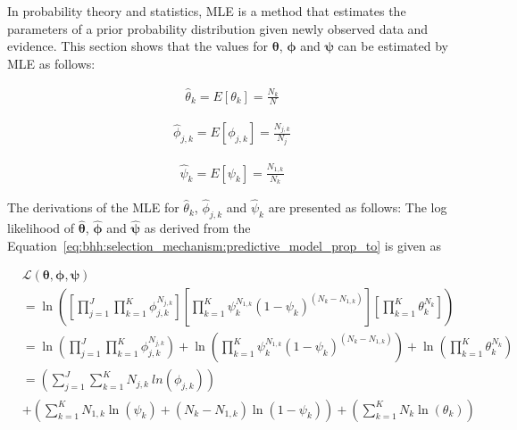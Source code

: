 In probability theory and statistics, \acf{MLE} is a method that estimates the parameters of a prior probability distribution given newly observed data and evidence. This section shows that the values for $\boldsymbol{\theta}$, $\boldsymbol{\phi}$ and $\boldsymbol{\psi}$ can be estimated by \acs{MLE} as follows:

\begin{equation}
      \label{eq:bhh:optimisation_step:mle:theta}
      \begin{split}
            \hat{\theta}_{k} = E[\theta_{k}] = \frac{N_{k}}{N}
      \end{split}
\end{equation}

\begin{equation}
      \label{eq:bhh:optimisation_step:mle:phi}
      \begin{split}
            \hat{\phi}_{j,k} = E[\phi_{j,k}] = \frac{N_{j,k}}{N_{j}}
      \end{split}
\end{equation}

\begin{equation}
      \label{eq:bhh:optimisation_step:mle:psi}
      \begin{split}
            \hat{\psi}_{k} = E[\psi_{k}] = \frac{N_{1,k}}{N_{k}}
      \end{split}
\end{equation}

The derivations of the \acs{MLE} for $\hat{\theta}_{k}$, $\hat{\phi}_{j,k}$ and
$\hat{\psi}_{k}$ are presented as follows: The log likelihood of $\boldsymbol{\hat{\theta}}$, $\boldsymbol{\hat{\phi}}$ and $\boldsymbol{\hat{\psi}}$ as derived from the Equation~\eqref{eq:bhh:selection_mechanism:predictive_model_prop_to} is given as

\begin{equation}
      \label{eq:bhh:optimisation_step:mle:log_likelihood_all}
      \begin{split}
            & \mathcal{L}(\boldsymbol{\theta}, \boldsymbol{\phi}, \boldsymbol{\psi}) \\
            &= \ln\left(\left[ \prod_{j=1}^{J} \prod_{k=1}^{K} \phi_{j,k}^{N_{j,k}} \right] \left[ \prod_{k=1}^{K} \psi_{k}^{N_{1,k}} (1 - \psi_{k})^{(N_{k} - N_{1,k})} \right] \left[ \prod_{k=1}^{K} \theta_{k}^{N_{k}} \right] \right) \\
            &= \ln \left( \prod_{j=1}^{J} \prod_{k=1}^{K} \phi_{j,k}^{N_{j,k}} \right) +  \ln \left( \prod_{k=1}^{K} \psi_{k}^{N_{1,k}} (1 - \psi_{k})^{(N_{k} - N_{1,k})} \right) + \ln \left( \prod_{k=1}^{K} \theta_{k}^{N_{k}} \right) \\
            &= \left( \sum_{j=1}^{J} \sum_{k=1}^{K} N_{j,k} \ ln \left( \phi_{j,k}
            \right) \right) \\
            &+ \left( \sum_{k=1}^{K} N_{1,k} \ln \left( \psi_{k} \right) + \left( N_{k} - N_{1,k} \right) \ln \left( 1 - \psi_{k} \right) \right) + \left( \sum_{k=1}^{K} N_{k} \ln \left( \theta_{k} \right) \right)
      \end{split}
\end{equation}

